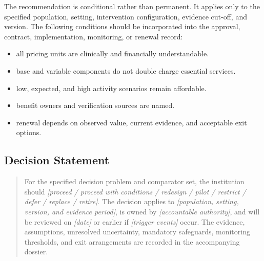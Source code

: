 The recommendation is conditional rather than permanent. It applies only to the
specified population, setting, intervention configuration, evidence cut-off, and
version. The following conditions should be incorporated into the approval,
contract, implementation, monitoring, or renewal record:

\begin{itemize}
 \item all pricing units are clinically and financially understandable.
 \item base and variable components do not double charge essential services.
 \item low, expected, and high activity scenarios remain affordable.
 \item benefit owners and verification sources are named.
 \item renewal depends on observed value, current evidence, and acceptable exit options.
\end{itemize}

\subsection{Decision Statement}
\begin{quote}
For the specified decision problem and comparator set, the institution should
\emph{[proceed / proceed with conditions / redesign / pilot / restrict / defer /
replace / retire]}. The decision applies to \emph{[population, setting, version,
and evidence period]}, is owned by \emph{[accountable authority]}, and will be
reviewed on \emph{[date]} or earlier if \emph{[trigger events]} occur. The
evidence, assumptions, unresolved uncertainty, mandatory safeguards, monitoring
thresholds, and exit arrangements are recorded in the accompanying dossier.
\end{quote}
